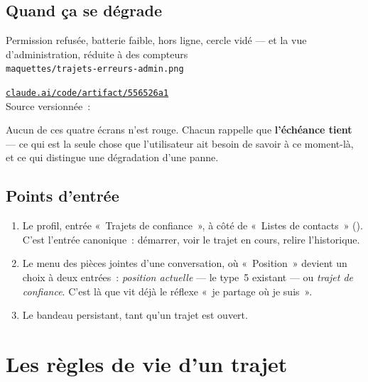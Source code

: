 \section{Quand ça se dégrade}

\begin{center}
    {Permission refusée, batterie faible, hors ligne, cercle vidé --- et la vue
     d'administration, réduite à des compteurs\\
     \texttt{maquettes/trajets-erreurs-admin.png}}
\end{center}

\begin{note}
\href{https://claude.ai/code/artifact/556526a1-c27a-4310-9435-158158a106ee}%
{\texttt{claude.ai/code/artifact/556526a1}}\\
Source versionnée~: 
\end{note}

Aucun de ces quatre écrans n'est rouge. Chacun rappelle que \textbf{l'échéance tient} --- ce
qui est la seule chose que l'utilisateur ait besoin de savoir à ce moment-là, et ce qui
distingue une dégradation d'une panne.

\section{Points d'entrée}

\begin{enumerate}[leftmargin=1.6em]
  \item Le profil, entrée «~Trajets de confiance~», à côté de «~Listes de contacts~»
        (). C'est l'entrée canonique~:
        démarrer, voir le trajet en cours, relire l'historique.
  \item Le menu des pièces jointes d'une conversation, où «~Position~» devient un choix à
        deux entrées~: \emph{position actuelle} --- le type~5 existant --- ou
        \emph{trajet de confiance}. C'est là que vit déjà le réflexe «~je partage où je
        suis~».
  \item Le bandeau persistant, tant qu'un trajet est ouvert.
\end{enumerate}

\chapter{Les règles de vie d'un trajet}

